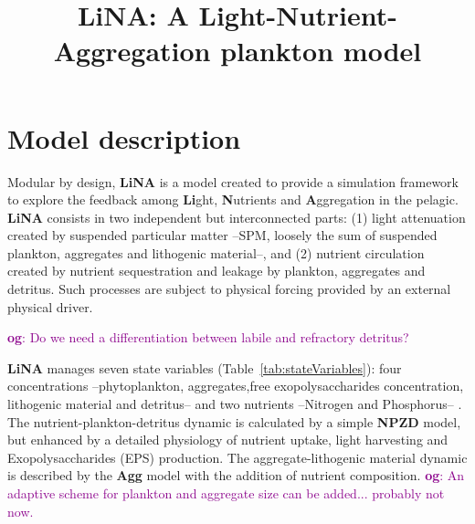 \documentclass[fleqn]{article}                     %
\title{LiNA: A Light-Nutrient-Aggregation plankton model}
\newcommand{\comment}[3][darkmagenta]{\textcolor{#1}{\textbf{#2}: #3}}
\newcommand{\LiNA}{\textbf{LiNA} }
\begin{document}
\maketitle


\section{Model description}

Modular by design, \LiNA is a model created to provide a simulation framework to explore the feedback among \textbf{Li}ght, \textbf{N}utrients and \textbf{A}ggregation in the pelagic.
\LiNA consists in two independent but interconnected parts: (1) light attenuation created by suspended particular matter --SPM, loosely the sum of suspended plankton, aggregates and lithogenic material--, and (2) nutrient circulation created by nutrient sequestration and leakage by plankton, aggregates and detritus.
Such processes are subject to physical forcing provided by an external physical driver.

\comment{og}{Do we need a differentiation between labile and refractory detritus?}

\LiNA manages seven state variables (Table~\ref{tab:stateVariables}): four concentrations --phytoplankton, aggregates,free exopolysaccharides concentration, lithogenic material and detritus-- and two nutrients --Nitrogen and Phosphorus-- .
The nutrient-plankton-detritus dynamic is calculated by a simple \textbf{NPZD} model, but enhanced by a detailed physiology of nutrient uptake, light harvesting and Exopolysaccharides (EPS) production.
The aggregate-lithogenic material dynamic is described by the \textbf{Agg} model with the addition of nutrient composition.
\comment{og}{An adaptive scheme for plankton and aggregate size can be added... probably not now.}
\end{document}
